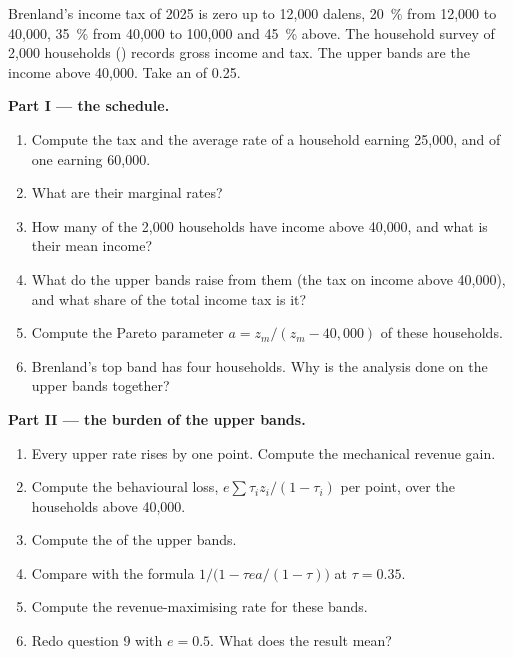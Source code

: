 \begin{problem}\label{pb:b3:efficiency-cost-of-taxation:brenland}
Brenland's income tax of 2025 is zero up to 12{,}000 dalens, 20~\% from 12{,}000 to 40{,}000,
35~\% from 40{,}000 to 100{,}000 and 45~\% above. The household survey of 2{,}000 households
() records gross income and tax. The upper bands are the
income above 40{,}000. Take an  of 0.25.

\medskip\noindent\textbf{Part I --- the schedule.}
\begin{enumerate}
\item Compute the tax and the average rate of a household earning 25{,}000, and of one
earning 60{,}000.
\item What are their marginal rates?
\item How many of the 2{,}000 households have income above 40{,}000, and what is their mean
income?
\item What do the upper bands raise from them (the tax on income above 40{,}000), and
what share of the total income tax is it?
\item Compute the Pareto parameter $a = z_m/(z_m - 40{,}000)$ of these households.
\item Brenland's top band has four households. Why is the analysis done on the upper
bands together?
\end{enumerate}

\medskip\noindent\textbf{Part II --- the burden of the upper bands.}
\begin{enumerate}[resume]
\item Every upper rate rises by one point. Compute the mechanical revenue gain.
\item Compute the behavioural loss, $e\sum\tau_iz_i/(1 - \tau_i)$ per point, over the households
above 40{,}000.
\item Compute the  of the upper bands.
\item Compare with the formula $1/\big(1 - \tau ea/(1 - \tau)\big)$ at $\tau = 0.35$.
\item Compute the revenue-maximising rate for these bands.
\item Redo question 9 with $e = 0.5$. What does the result mean?
\end{enumerate}


\end{problem}
